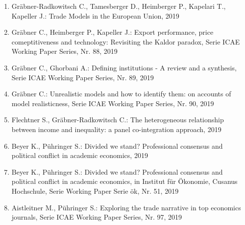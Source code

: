 \begin{enumerate}
	 \item Gräbner-Radkowitsch C., Tamesberger D., Heimberger P., Kapelari T., Kapeller J.: Trade Models in the European Union, 2019
	 \item Gräbner C., Heimberger P., Kapeller J.: Export performance, price comeptitiveness and technology: Revisiting the Kaldor paradox, Serie ICAE Working Paper Series, Nr. 88, 2019
	 \item Gräbner C., Ghorbani A.: Defining institutions - A review and a synthesis, Serie ICAE Working Paper Series, Nr. 89, 2019
	 \item Gräbner C.: Unrealistic models and how to identify them: on accounts of model realisticness, Serie ICAE Working Paper Series, Nr. 90, 2019
	 \item Flechtner S., Gräbner-Radkowitsch C.: The heterogeneous relationship between income and inequality: a panel co-integration approach, 2019
	 \item Beyer K., Pühringer S.: Divided we stand? Professional consensus and political conflict in academic economics, 2019
	 \item Beyer K., Pühringer S.: Divided we stand? Professional consensus and political conflict in academic economics, in Institut für Ökonomie, Cusanus Hochschule, Serie Working Paper Serie ök, Nr. 51, 2019
	 \item Aistleitner M., Pühringer S.: Exploring the trade narrative in top economics journals, Serie ICAE Working Paper Series, Nr. 97, 2019
\end{enumerate}

